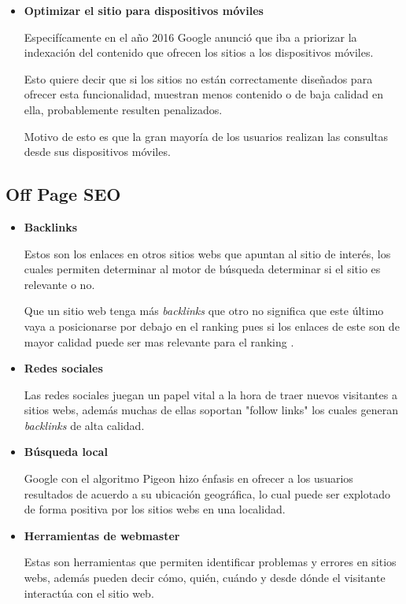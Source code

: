\documentclass[12pt]{llncs}
\begin{document}
\begin{itemize}
\item \textbf{Optimizar el sitio para dispositivos móviles} \cite{mobile}

Especifícamente en el año 2016 Google anunció que iba a priorizar la indexación del contenido que ofrecen los sitios a los dispositivos móviles.

Esto quiere decir que si los sitios no están correctamente diseñados para ofrecer esta funcionalidad, muestran menos contenido o de baja calidad en ella, probablemente resulten penalizados.

Motivo de esto es que la gran mayoría de los usuarios realizan las consultas desde sus dispositivos móviles.


\end{itemize}

\subsection{Off Page SEO}
\begin{itemize}
\item \textbf{Backlinks}

Estos son los enlaces en otros sitios webs que apuntan al sitio de interés, los cuales permiten determinar al motor de búsqueda determinar si el sitio es relevante o no.

Que un sitio web tenga más \textit{backlinks} que otro no significa que este último vaya a posicionarse por debajo en el ranking pues si los enlaces de este son de mayor calidad puede ser mas relevante para el ranking \cite{imp_seo}.

\item \textbf{Redes sociales}

Las redes sociales juegan un papel vital a la hora de traer nuevos visitantes a sitios webs, además muchas de ellas soportan "follow links" los cuales generan \textit{backlinks} de alta calidad.

\item \textbf{Búsqueda local}

Google con el algoritmo Pigeon hizo énfasis en ofrecer a los usuarios resultados de acuerdo a su ubicación geográfica, lo cual puede ser explotado de forma positiva por los sitios webs en una localidad.

\item \textbf{Herramientas de webmaster}

Estas son herramientas que permiten identificar problemas y errores en sitios webs, además pueden decir cómo, quién, cuándo y desde dónde el visitante interactúa con el sitio web.

\end{itemize}
\end{document}

